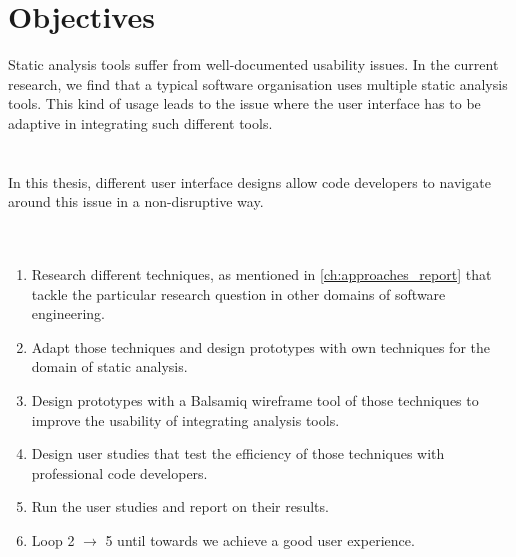 \chapter{Objectives}
\label{ch:objectives_report}

Static analysis tools suffer from well-documented usability issues. \cite{CB16,JSMB13} In the current research, we find that a typical software organisation uses multiple static analysis tools. This kind of usage leads to the issue where the user interface has to be adaptive in integrating such different tools. \\ \\ \\


In this thesis, different user interface designs allow code developers to navigate around this issue in a non-disruptive way. \\ \\ \\

\begin{enumerate}
	
\item  Research different techniques, as mentioned in \autoref{ch:approaches_report} that tackle the particular research question in other domains of software engineering.

\item  Adapt those techniques and design prototypes with own techniques for the domain of static analysis.

\item  Design prototypes with a Balsamiq wireframe tool \cite{B} of those techniques to improve the usability of integrating analysis tools.

\item  Design user studies that test the efficiency of those techniques with professional code developers.

\item  Run the user studies and report on their results.

\item  Loop 2 $\rightarrow$ 5 until towards we achieve a good user experience.
\end{enumerate}

\let\cleardoublepage\clearpage